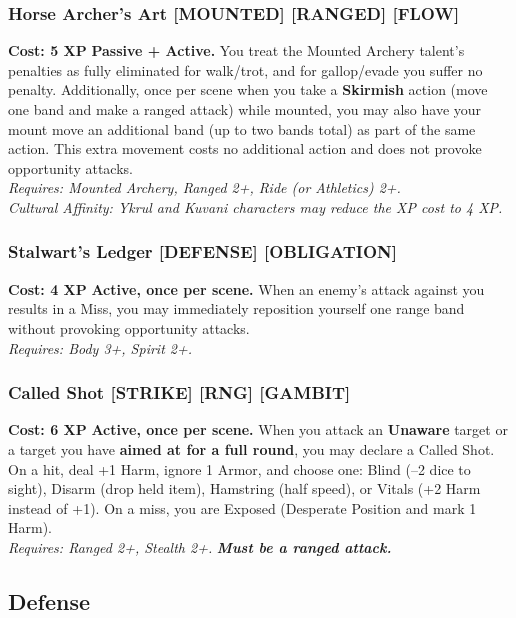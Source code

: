 \subsubsection*{Horse Archer's Art \textnormal{[MOUNTED] [RANGED] [FLOW]}}
\label{talent:horse-archers-art}
\textbf{Cost: 5 XP} \textbf{Passive + Active.} You treat the Mounted Archery talent's penalties as fully eliminated for walk/trot, and for gallop/evade you suffer no penalty. Additionally, once per scene when you take a \textbf{Skirmish} action (move one band and make a ranged attack) while mounted, you may also have your mount move an additional band (up to two bands total) as part of the same action. This extra movement costs no additional action and does not provoke opportunity attacks. \\
\textit{Requires: Mounted Archery, Ranged 2+, Ride (or Athletics) 2+.} \\
\textit{Cultural Affinity: Ykrul and Kuvani characters may reduce the XP cost to 4 XP.}

\subsubsection*{Stalwart's Ledger \textnormal{[DEFENSE] [OBLIGATION]}}
\label{talent:stalwarts-ledger}
\textbf{Cost: 4 XP} \textbf{Active, once per scene.}
When an enemy's attack against you results in a Miss, you may immediately reposition yourself one range band without provoking opportunity attacks. \\
\textit{Requires: Body 3+, Spirit 2+.}

\subsubsection*{Called Shot \textnormal{[STRIKE] [RNG] [GAMBIT]}}
\label{talent:called-shot}
\textbf{Cost: 6 XP} \textbf{Active, once per scene.} When you attack an \textbf{Unaware} target or a target you have \textbf{aimed at for a full round}, you may declare a Called Shot. On a hit, deal +1 Harm, ignore 1 Armor, and choose one: Blind (--2 dice to sight), Disarm (drop held item), Hamstring (half speed), or Vitals (+2 Harm instead of +1). On a miss, you are Exposed (Desperate Position and mark 1 Harm). \\
\textit{Requires: Ranged 2+, Stealth 2+.} \textbf{\textit{Must be a ranged attack.}}

\subsection*{Defense}
\label{sec:major-defense}


